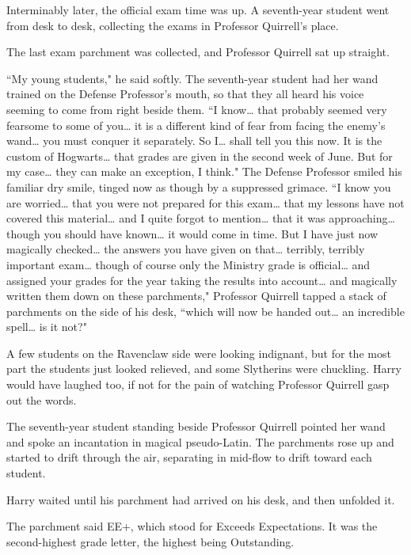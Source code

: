 Interminably later, the official exam time was up. A seventh-year student went from desk to desk, collecting the exams in Professor Quirrell's place.

The last exam parchment was collected, and Professor Quirrell sat up straight.

``My young students," he said softly. The seventh-year student had her wand trained on the Defense Professor's mouth, so that they all heard his voice seeming to come from right beside them. ``I know{\ldots} that probably seemed very fearsome to some of you{\ldots} it is a different kind of fear from facing the enemy's wand{\ldots} you must conquer it separately. So I{\ldots} shall tell you this now. It is the custom of Hogwarts{\ldots} that grades are given in the second week of June. But for my case{\ldots} they can make an exception, I think." The Defense Professor smiled his familiar dry smile, tinged now as though by a suppressed grimace. ``I know you are worried{\ldots} that you were not prepared for this exam{\ldots} that my lessons have not covered this material{\ldots} and I quite forgot to mention{\ldots} that it was approaching{\ldots} though you should have known{\ldots} it would come in time. But I have just now magically checked{\ldots} the answers you have given on that{\ldots} terribly, terribly important exam{\ldots} though of course only the Ministry grade is official{\ldots} and assigned your grades for the year taking the results into account{\ldots} and magically written them down on these parchments," Professor Quirrell tapped a stack of parchments on the side of his desk, ``which will now be handed out{\ldots} an incredible spell{\ldots} is it not?"

A few students on the Ravenclaw side were looking indignant, but for the most part the students just looked relieved, and some Slytherins were chuckling. Harry would have laughed too, if not for the pain of watching Professor Quirrell gasp out the words.

The seventh-year student standing beside Professor Quirrell pointed her wand and spoke an incantation in magical pseudo-Latin. The parchments rose up and started to drift through the air, separating in mid-flow to drift toward each student.

Harry waited until his parchment had arrived on his desk, and then unfolded it.

The parchment said EE+, which stood for Exceeds Expectations. It was the second-highest grade letter, the highest being Outstanding.

